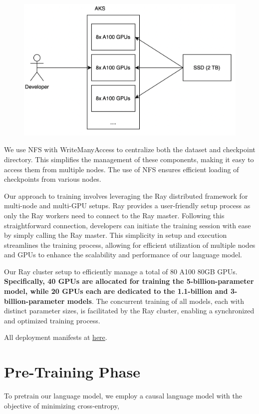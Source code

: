\documentclass[preprint]{article}
\begin{document}
\begin{figure}[h]
  \centering
  \includegraphics[width=0.6\linewidth]{pic/aks-gpu.png} %
\end{figure}

We use NFS with WriteManyAccess to centralize both the dataset and checkpoint directory. This simplifies the management of these components, making it easy to access them from multiple nodes. The use of NFS ensures efficient loading of checkpoints from various nodes.

Our approach to training involves leveraging the Ray distributed framework \cite{moritz2018ray} for multi-node and multi-GPU setups. Ray provides a user-friendly setup process as only the Ray workers need to connect to the Ray master. Following this straightforward connection, developers can initiate the training session with ease by simply calling the Ray master. This simplicity in setup and execution streamlines the training process, allowing for efficient utilization of multiple nodes and GPUs to enhance the scalability and performance of our language model.

Our Ray cluster setup to efficiently manage a total of 80 A100 80GB GPUs. \textbf{Specifically, 40 GPUs are allocated for training the 5-billion-parameter model, while 20 GPUs each are dedicated to the 1.1-billion and 3-billion-parameter models}. The concurrent training of all models, each with distinct parameter sizes, is facilitated by the Ray cluster, enabling a synchronized and optimized training process.

All deployment manifests at \href{https://github.com/mesolitica/malaya/wiki/MaLLaM-%F0%9F%8C%99-Malaysia-Large-Language-Model#how-about-the-cluster-deployments}{here}.

\section{Pre-Training Phase}\label{sec:4096-pretrained}

To pretrain our language model, we employ a causal language model with the objective of minimizing cross-entropy,
\end{document}
